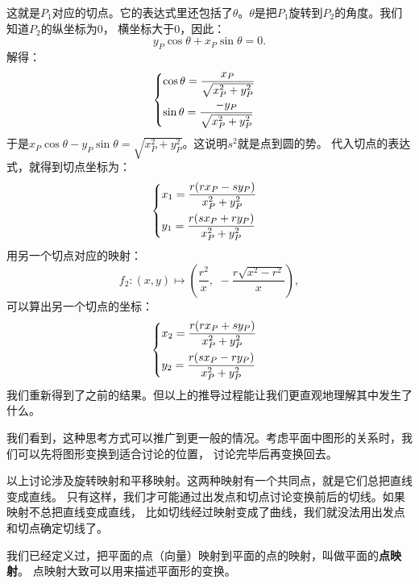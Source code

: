 \documentclass[12pt,UTF8]{ctexbook}
\begin{document}
这就是$P_1$对应的切点。它的表达式里还包括了$\theta$。$\theta$是把$P_1$旋转到$P_2$的角度。我们知道$P_2$的纵坐标为$0$，
横坐标大于$0$，因此：
$$ y_P \cos{\theta} + x_P\sin{\theta} = 0. $$
解得：
\begin{alignat*}{1}
&   \begin{dcases}
        \cos{\theta} = \frac{x_P}{\sqrt{x_P^2 + y_P^2}} \\
        \sin{\theta} = \frac{-y_P}{\sqrt{x_P^2 + y_P^2}} 
    \end{dcases}
\end{alignat*}
于是$x_P\cos{\theta} - y_P\sin{\theta} = \sqrt{x_P^2 + y_P^2}$。这说明$s^2$就是点到圆的势。
代入切点的表达式，就得到切点坐标为：
\begin{alignat*}{1}
    &   \begin{dcases}
    x_1 = \frac{r(rx_P - sy_P) }{x_P^2+y_P^2} \\
    y_1 = \frac{r(sx_P + ry_P)}{x_P^2+y_P^2}
\end{dcases}
\end{alignat*}
用另一个切点对应的映射：
$$f_2: (x, y) \mapsto \left(\frac{r^2}{x},\,\, -\frac{r\sqrt{x^2 - r^2}}{x}\right),$$
可以算出另一个切点的坐标：
\begin{alignat*}{1}
    &   \begin{dcases}
        x_2 = \frac{r(rx_P + sy_P) }{x_P^2+y_P^2} \\
        y_2 = \frac{r(sx_P - ry_P)}{x_P^2+y_P^2}
    \end{dcases}
\end{alignat*}
我们重新得到了之前的结果。但以上的推导过程能让我们更直观地理解其中发生了什么。

我们看到，这种思考方式可以推广到更一般的情况。考虑平面中图形的关系时，我们可以先将图形变换到适合讨论的位置，
讨论完毕后再变换回去。

以上讨论涉及旋转映射和平移映射。这两种映射有一个共同点，就是它们总把直线变成直线。
只有这样，我们才可能通过出发点和切点讨论变换前后的切线。如果映射不总把直线变成直线，
比如切线经过映射变成了曲线，我们就没法用出发点和切点确定切线了。

我们已经定义过，把平面的点（向量）映射到平面的点的映射，叫做平面的\textbf{点映射}。
点映射大致可以用来描述平面形的变换。
\end{document}
